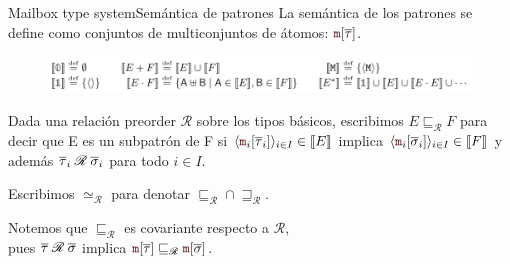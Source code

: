 \documentclass{beamer}
\newcommand{\msgtag}[1]{\texttt{\textcolor{msg-color}{#1}}}
\newcommand{\msgstore}[2]{\msgtag{#1}[\overline{#2}]}
\begin{document}
\begin{frame}{Mailbox type system}{Semántica de patrones}
    La semántica de los patrones se define como conjuntos de multiconjuntos de átomos: $\msgstore{m}{\tau}$.

    \begin{figure}[H]
        \includegraphics[width=\textwidth]{subpattern}
    \end{figure}

    Dada una relación preorder $\mathscr{R}$ sobre los tipos básicos, escribimos $E \sqsubseteq_\mathscr{R} F$ para decir que E es un subpatrón de F si $\langle \msgtag{m}_i[\overline{\tau}_i] \rangle_{i \in I} \in \llbracket E \rrbracket$ implica $\langle \msgtag{m}_i[\overline{\sigma}_i] \rangle_{i \in I} \in \llbracket F \rrbracket$ y además $\overline{\tau}_i \hspace{0.25em} \mathscr{R} \hspace{0.25em} \overline{\sigma}_i$ para todo $i \in I$.
    \vspace{1em}

    Escribimos $\simeq_\mathscr{R}$ para denotar $\sqsubseteq_\mathscr{R} \cap \sqsupseteq_\mathscr{R}$.
    \vspace{1em}

    Notemos que $\sqsubseteq_\mathscr{R}$ es covariante respecto a $\mathscr{R}$,
    \\ pues $\overline{\tau} \hspace{0.25em} \mathscr{R} \hspace{0.25em} \overline{\sigma}$ implica $\msgstore{m}{\tau} \sqsubseteq_\mathscr{R} \msgstore{m}{\sigma}$.
\end{frame}
\end{document}
